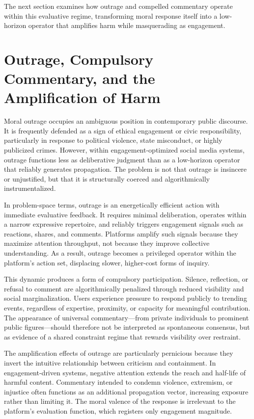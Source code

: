 \documentclass[12pt]{article}
\begin{document}
The next section examines how outrage and compelled commentary operate within this evaluative regime, transforming moral response itself into a low-horizon operator that amplifies harm while masquerading as engagement.

\section{Outrage, Compulsory Commentary, and the Amplification of Harm}

Moral outrage occupies an ambiguous position in contemporary public discourse. It is frequently defended as a sign of ethical engagement or civic responsibility, particularly in response to political violence, state misconduct, or highly publicized crimes. However, within engagement-optimized social media systems, outrage functions less as deliberative judgment than as a low-horizon operator that reliably generates propagation. The problem is not that outrage is insincere or unjustified, but that it is structurally coerced and algorithmically instrumentalized.

In problem-space terms, outrage is an energetically efficient action with immediate evaluative feedback. It requires minimal deliberation, operates within a narrow expressive repertoire, and reliably triggers engagement signals such as reactions, shares, and comments. Platforms amplify such signals because they maximize attention throughput, not because they improve collective understanding. As a result, outrage becomes a privileged operator within the platform’s action set, displacing slower, higher-cost forms of inquiry.

This dynamic produces a form of compulsory participation. Silence, reflection, or refusal to comment are algorithmically penalized through reduced visibility and social marginalization. Users experience pressure to respond publicly to trending events, regardless of expertise, proximity, or capacity for meaningful contribution. The appearance of universal commentary—from private individuals to prominent public figures—should therefore not be interpreted as spontaneous consensus, but as evidence of a shared constraint regime that rewards visibility over restraint.

The amplification effects of outrage are particularly pernicious because they invert the intuitive relationship between criticism and containment. In engagement-driven systems, negative attention extends the reach and half-life of harmful content. Commentary intended to condemn violence, extremism, or injustice often functions as an additional propagation vector, increasing exposure rather than limiting it. The moral valence of the response is irrelevant to the platform’s evaluation function, which registers only engagement magnitude.
\end{document}
